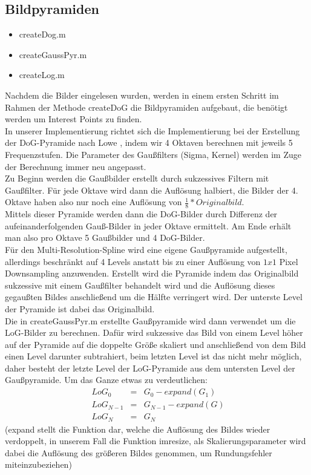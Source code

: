 \documentclass[deutsch]{scrartcl}
\begin{document}
\subsection{Bildpyramiden}
\begin{itemize}
	\item createDog.m 
	\item createGaussPyr.m 
	\item createLog.m
\end{itemize}
Nachdem die Bilder eingelesen wurden, werden in einem ersten Schritt im Rahmen
der Methode createDoG die Bildpyramiden aufgebaut, die benötigt werden um
Interest Points zu finden. \\
In unserer Implementierung richtet sich die Implementierung bei der Erstellung der DoG-Pyramide nach Lowe \cite{lowe04}, indem wir 4 Oktaven berechnen mit jeweils 5 Frequenzstufen. Die Parameter des Gaußfilters (Sigma, Kernel) werden im Zuge der Berechnung immer neu angepasst.\\
Zu Beginn werden die Gaußbilder erstellt durch sukzessives Filtern mit Gaußfilter. Für jede Oktave wird dann die Auflösung halbiert, die Bilder der 4. Oktave haben also nur noch eine Auflösung von $\frac{1}{8} * Originalbild$.\\
Mittels dieser Pyramide werden dann die DoG-Bilder durch Differenz der aufeinanderfolgenden Gauß-Bilder in jeder Oktave ermittelt. Am Ende erhält man also pro Oktave 5 Gaußbilder und 4 DoG-Bilder.\\
Für den Multi-Resolution-Spline wird eine eigene Gaußpyramide aufgestellt, allerdings beschränkt auf 4 Levels anstatt bis zu einer Auflösung von $1x1$ Pixel Downsampling anzuwenden. Erstellt wird die Pyramide indem das Originalbild sukzessive mit einem Gaußfilter behandelt wird und die Auflösung dieses gegaußten Bildes anschließend um die Hälfte verringert wird. Der unterste Level der Pyramide ist dabei das Originalbild.\\
Die in createGaussPyr.m erstellte Gaußpyramide wird dann verwendet um die LoG-Bilder zu berechnen. Dafür wird sukzessive das Bild von einem Level höher auf der Pyramide auf die doppelte Größe skaliert und anschließend von dem Bild einen Level darunter subtrahiert, beim letzten Level ist das nicht mehr möglich, daher besteht der letzte Level der LoG-Pyramide aus dem untersten Level der Gaußpyramide. Um das Ganze etwas zu verdeutlichen:
\begin{eqnarray*}
\ LoG_0 &=& G_0 - expand(G_1) \\
\ LoG_{N-1} &=& G_{N-1} - expand(G) \\
\ LoG_N &=& G_N
\end{eqnarray*}
(expand stellt die Funktion dar, welche die Auflösung des Bildes wieder verdoppelt, in unserem Fall die Funktion imresize, als Skalierungsparameter wird dabei die Auflösung des größeren Bildes genommen, um Rundungsfehler miteinzubeziehen)
\end{document}
